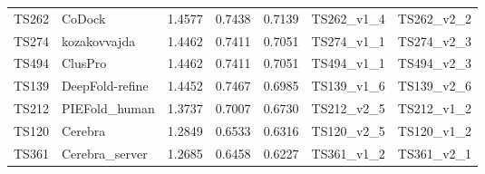 \begin{table}[ht]
{\begin{tabular}{llrrrll}
TS262 & CoDock & 1.4577 & 0.7438 & 0.7139 & TS262\_v1\_4 & TS262\_v2\_2 \\ 
TS274 & kozakovvajda & 1.4462 & 0.7411 & 0.7051 & TS274\_v1\_1 & TS274\_v2\_3 \\ 
TS494 & ClusPro & 1.4462 & 0.7411 & 0.7051 & TS494\_v1\_1 & TS494\_v2\_3 \\ 
TS139 & DeepFold-refine & 1.4452 & 0.7467 & 0.6985 & TS139\_v1\_6 & TS139\_v2\_6 \\ 
TS212 & PIEFold\_human & 1.3737 & 0.7007 & 0.6730 & TS212\_v2\_5 & TS212\_v1\_2 \\ 
TS120 & Cerebra & 1.2849 & 0.6533 & 0.6316 & TS120\_v2\_5 & TS120\_v1\_2 \\ 
TS361 & Cerebra\_server & 1.2685 & 0.6458 & 0.6227 & TS361\_v1\_2 & TS361\_v2\_1 \\ 
\bottomrule
\end{tabular}%
}
\end{table}
